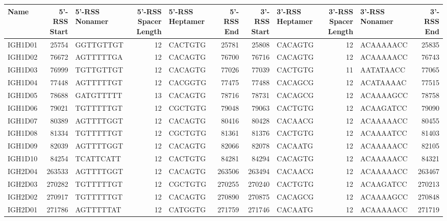 \begin{tabular}{lrlrlrrlrlr}
  \toprule Name & 5’-RSS Start & 5’-RSS Nonamer & 5’-RSS Spacer Length & 5’-RSS Heptamer & 5’-RSS End & 3’-RSS Start & 3’-RSS Heptamer & 3’-RSS  Spacer Length & 3’-RSS Nonamer & 3’-RSS End \\ 
  \midrule IGH1D01 & 25754 & GGTTGTTGT & 12 & CACTGTG & 25781 & 25808 & CACAGTG & 12 & ACAAAAACC & 25835 \\ 
  IGH1D02 & 76672 & AGTTTTTGA & 12 & CACAGTG & 76700 & 76716 & CACAGTG & 12 & ACAAAAACC & 76743 \\ 
  IGH1D03 & 76999 & TGTTGTTGT & 12 & CACAGTG & 77026 & 77039 & CACTGTG & 11 & AATATAACC & 77065 \\ 
  IGH1D04 & 77448 & AGTTTTTGT & 12 & CACGGTG & 77475 & 77488 & CACAGCG & 12 & ACATAAAAC & 77515 \\ 
  IGH1D05 & 78688 & GATGTTTTT & 13 & CACAGTG & 78716 & 78731 & CACAGCG & 12 & ACAAAAGCC & 78758 \\ 
  IGH1D06 & 79021 & TGTTTTTGT & 12 & CGCTGTG & 79048 & 79063 & CACTGTG & 12 & ACAAGATCC & 79090 \\ 
  IGH1D07 & 80389 & AGTTTTGGT & 12 & CACAGTG & 80416 & 80428 & CACAACG & 12 & ACAAAAACC & 80455 \\ 
  IGH1D08 & 81334 & TGTTTTTGT & 12 & CGCTGTG & 81361 & 81376 & CACTGTG & 12 & ACAAAATCC & 81403 \\ 
  IGH1D09 & 82039 & AGTTTTGGT & 12 & CACAGTG & 82066 & 82078 & CACAATG & 12 & ACAAAAACC & 82105 \\ 
  IGH1D10 & 84254 & TCATTCATT & 12 & CACTGTG & 84281 & 84294 & CACAGTG & 12 & ACAAAAACC & 84321 \\ 
  IGH2D04 & 263533 & AGTTTTGGT & 12 & CACAGTG & 263506 & 263494 & CACAACG & 12 & ACAAAAACC & 263467 \\ 
  IGH2D03 & 270282 & TGTTTTTGT & 12 & CGCTGTG & 270255 & 270240 & CACTGTG & 12 & ACAAGATCC & 270213 \\ 
  IGH2D02 & 270917 & TGTTTTTGT & 12 & CACAGTG & 270890 & 270875 & CACAGCG & 12 & ACAAAAGCC & 270848 \\ 
  IGH2D01 & 271786 & AGTTTTTAT & 12 & CATGGTG & 271759 & 271746 & CACAATG & 12 & ACAAAAACC & 271719 \\ 
   \bottomrule \end{tabular}
